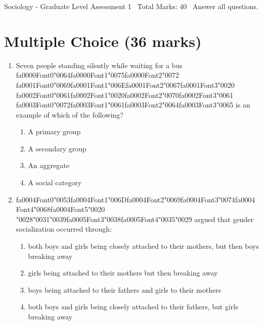 \documentclass[12pt]{article}
\begin{document}
\begin{center}
Sociology - Graduate Level Assessment 1 \
Total Marks: 40 \
Answer all questions.
\end{center}

\section*{Multiple Choice (36 marks)}
\begin{enumerate}[label=\arabic*.]
\item Seven people standing silently while waiting for a bus {\csname fa0000Font0\endcsname\char"0064}{\csname fa0000Font1\endcsname\char"0075}{\csname fa0000Font2\endcsname\char"0072} {\csname fa0001Font0\endcsname\char"0069}{\csname fa0001Font1\endcsname\char"006E}{\csname fa0001Font2\endcsname\char"0067}{\csname fa0001Font3\endcsname\char"0020} {\csname fa0002Font0\endcsname\char"0061}{\csname fa0002Font1\endcsname\char"0020}{\csname fa0002Font2\endcsname\char"0070}{\csname fa0002Font3\endcsname\char"0061} {\csname fa0003Font0\endcsname\char"0072}{\csname fa0003Font1\endcsname\char"0061}{\csname fa0003Font2\endcsname\char"0064}{\csname fa0003Font3\endcsname\char"0065} is an example of which of the following?
\begin{enumerate}[label=(\alph*)]
    \item A primary group
    \item A secondary group
    \item An aggregate
    \item A social category
\end{enumerate}
\item {\csname fa0004Font0\endcsname\char"0053}{\csname fa0004Font1\endcsname\char"006D}{\csname fa0004Font2\endcsname\char"0069}{\csname fa0004Font3\endcsname\char"0074}{\csname fa0004Font4\endcsname\char"0068}{\csname fa0004Font5\endcsname\char"0020} {\char"0028}{\char"0031}{\char"0039}{\csname fa0005Font3\endcsname\char"0038}{\csname fa0005Font4\endcsname\char"0035}{\char"0029} argued that gender socialization occurred through:
\begin{enumerate}[label=(\alph*)]
    \item both boys and girls being closely attached to their mothers, but then boys breaking away
    \item girls being attached to their mothers but then breaking away
    \item boys being attached to their fathers and girls to their mothers
    \item both boys and girls being closely attached to their fathers, but girls breaking away

\end{enumerate}
\end{enumerate}
\end{document}
